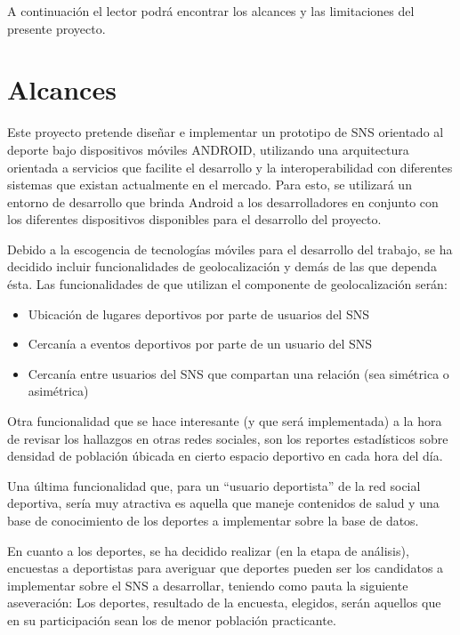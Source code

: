 A continuación el lector podrá encontrar los alcances y las limitaciones del presente proyecto.

\section{Alcances}

Este proyecto pretende diseñar e implementar un prototipo de SNS orientado al deporte bajo dispositivos móviles ANDROID, utilizando una arquitectura orientada a servicios que facilite el desarrollo y la interoperabilidad con diferentes sistemas que existan actualmente en el mercado. Para esto, se utilizará un entorno de desarrollo que brinda Android a los desarrolladores en conjunto con los diferentes dispositivos disponibles para el desarrollo del proyecto.

Debido a la escogencia de tecnologías móviles para el desarrollo del trabajo, se ha decidido incluir funcionalidades de geolocalización y demás de las que dependa ésta. Las funcionalidades de que utilizan el componente de geolocalización serán:

\begin{itemize}
  \item Ubicación de lugares deportivos por parte de usuarios del SNS
  \item Cercanía a eventos deportivos por parte de un usuario del SNS
  \item Cercanía entre usuarios del SNS que compartan una relación (sea simétrica o asimétrica)
\end{itemize}

Otra funcionalidad que se hace interesante (y que será implementada) a la hora de revisar los hallazgos en otras redes sociales, son los reportes estadísticos sobre densidad de población úbicada en cierto espacio deportivo en cada hora del día.

Una última funcionalidad que, para un “usuario deportista” de la red social deportiva, sería muy atractiva es aquella que maneje contenidos de salud y una base de conocimiento de los deportes a implementar sobre la base de datos.

En cuanto a los deportes, se ha decidido realizar (en la etapa de análisis), encuestas a deportistas para averiguar que deportes pueden ser los candidatos a implementar sobre el SNS a desarrollar, teniendo como pauta la siguiente aseveración: Los deportes, resultado de la encuesta, elegidos, serán aquellos que en su participación sean los de menor población practicante.

